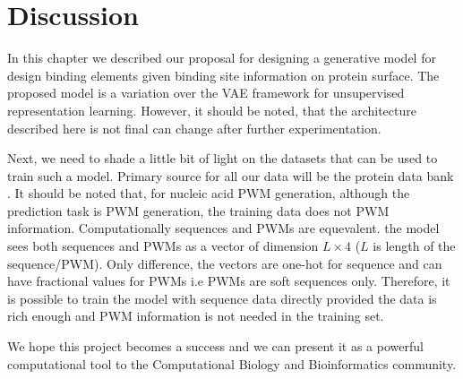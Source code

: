 \section{Discussion}
In this chapter we described our proposal for designing a generative model for design binding
elements given binding site information on protein surface. The proposed model is a variation over the VAE
framework \citep{Kingma2014} for unsupervised representation learning. However, it should be noted,
that the architecture described here is not final can change after further experimentation.

Next, we need to shade a little bit of light on the datasets that can be used to train such a model.
Primary source for all our data will be the protein data bank \citep{berman2000protein}. It should
be noted that, for nucleic acid PWM generation, although the prediction task is PWM generation, the
training data does not PWM information. Computationally sequences and PWMs are equevalent. the model
sees both sequences and PWMs as a vector of dimension $L \times 4$ ($L$ is length of the
sequence/PWM). Only difference, the vectors are one-hot for sequence and can have fractional values
for PWMs i.e PWMs are soft sequences only. Therefore, it is possible to train the model with
sequence data directly provided the data is rich enough and PWM information is not needed in the
training set. 

We hope this project becomes a success and we can present it as a powerful computational tool to the
Computational Biology and Bioinformatics community.
